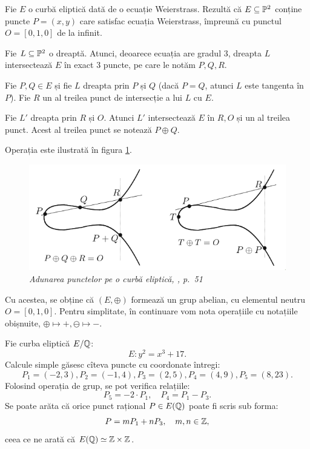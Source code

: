 Fie $ E $ o curbă eliptică dată de o ecuație Weierstrass. Rezultă că
$ E \subseteq \mathbb{P}^2 $ conține puncte $ P = (x, y) $ care satisfac ecuația
Weierstrass, împreună cu punctul $ O = [0, 1, 0] $ de la infinit.

Fie $ L \subseteq \mathbb{P}^2 $ o dreaptă. Atunci, deoarece ecuația are gradul 3,
dreapta $ L $ intersectează $ E $ în exact 3 puncte, pe care le notăm
$ P, Q, R $.

\begin{definition}\label{def:adunare-eliptic}
    Fie $P, Q \in E $ și fie $ L $ dreapta prin $ P $ și $ Q $ (dacă $ P = Q $,
    atunci $ L $ este tangenta în $ P $). Fie $ R $ un al treilea punct
    de intersecție a lui $ L $ cu $ E $.

    Fie $ L' $ dreapta prin $ R $ și $ O $. Atunci $ L' $ intersectează
    $ E $ în $ R, O $ și un al treilea punct. Acest al treilea punct se notează
    $ P \oplus Q $.
\end{definition}

Operația este ilustrată în figura \ref{fig:adunare-el}.
\begin{figure}[!htbp]
    \centering
    \includegraphics[scale=0.5]{figs/adunare-el.png}
    \caption{\textit{Adunarea punctelor pe o curbă eliptică, \cite{sil09}, p.\ 51}}
    \label{fig:adunare-el}
\end{figure}

Cu acestea, se obține că $ (E, \oplus) $ formează un grup abelian, cu elementul
neutru $ O = [0, 1, 0] $. Pentru simplitate, în continuare vom nota operațiile
cu notațiile obișnuite, $ \oplus \mapsto +, \ominus \mapsto - $.

\begin{example}\label{exm:eliptic-grup}
    Fie curba eliptică $ E/\mathbb{Q} $:
    \[
          E : y^2 = x^3 + 17.
    \]
    Calcule simple găsesc cîteva puncte cu coordonate întregi:
    \[
        P_1 = (-2, 3), P_2 = (-1, 4), P_3 = (2, 5), P_4 = (4, 9), P_5 = (8, 23).
    \]
    Folosind operația de grup, se pot verifica relațiile:
    \[
          P_5 = -2 \cdot P_1, \quad P_4 = P_1 - P_3.
    \]
    Se poate arăta că orice punct rațional $ P \in E(\mathbb{Q}) $ poate fi scris sub forma:
    \[
          P = mP_1 + nP_3, \quad m, n \in \mathbb{Z},
    \]
    ceea ce ne arată că $ E(\mathbb{Q}) \simeq \mathbb{Z} \times \mathbb{Z} $.
\end{example}

